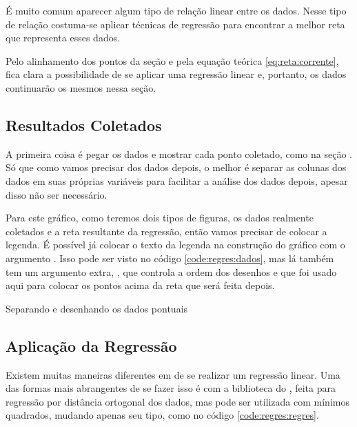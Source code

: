 É muito comum aparecer algum tipo de relação linear entre os dados. Nesse tipo de relação costuma-se aplicar técnicas de regressão para encontrar a melhor reta que representa esses dados.

Pelo alinhamento dos pontos da seção  e pela equação teórica \ref{eq:reta:corrente}, fica clara a possibilidade de se aplicar uma regressão linear e, portanto, os dados continuarão os mesmos nessa seção.


\subsection{Resultados Coletados}

    A primeira coisa é pegar os dados e mostrar cada ponto coletado, como na seção . Só que como vamos precisar dos dados depois, o melhor é separar as colunas dos dados em suas próprias variáveis para facilitar a análise dos dados depois, apesar disso não ser necessário.

    Para este gráfico, como teremos dois tipos de figuras, os dados realmente coletados e a reta resultante da regressão, então vamos precisar de colocar a legenda. É possível já colocar o texto da legenda na construção do gráfico com o argumento . Isso pode ser visto no código \ref{code:regres:dados}, mas lá também tem um argumento extra, , que controla a ordem dos desenhos e que foi usado aqui para colocar os pontos acima da reta que será feita depois.

    \begin{listing}[H]
        \caption{Separando e desenhando os dados pontuais}
        \label{code:regres:dados}

    \end{listing}


\subsection{Aplicação da Regressão}

    Existem muitas maneiras diferentes em \software de se realizar um regressão linear. Uma das formas mais abrangentes de se fazer isso é com a biblioteca  do \scipy, feita para regressão por distância ortogonal dos dados, mas pode ser utilizada com mínimos quadrados, mudando apenas seu tipo, como no código \ref{code:regres:regres}.

